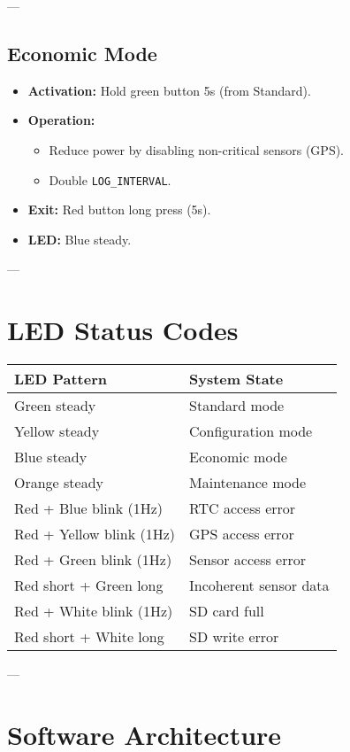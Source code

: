 \documentclass[a4paper,12pt]{article}
\begin{document}
---

\subsection{Economic Mode}
\begin{itemize}
  \item \textbf{Activation:} Hold green button 5s (from Standard).
  \item \textbf{Operation:}
  \begin{itemize}
    \item Reduce power by disabling non-critical sensors (GPS).
    \item Double \texttt{LOG\_INTERVAL}.
  \end{itemize}
  \item \textbf{Exit:} Red button long press (5s).
  \item \textbf{LED:} Blue steady.
\end{itemize}

---

\section{LED Status Codes}

\begin{longtable}{|l|l|}
\hline
\textbf{LED Pattern} & \textbf{System State} \\ \hline
Green steady & Standard mode \\ \hline
Yellow steady & Configuration mode \\ \hline
Blue steady & Economic mode \\ \hline
Orange steady & Maintenance mode \\ \hline
Red + Blue blink (1Hz) & RTC access error \\ \hline
Red + Yellow blink (1Hz) & GPS access error \\ \hline
Red + Green blink (1Hz) & Sensor access error \\ \hline
Red short + Green long & Incoherent sensor data \\ \hline
Red + White blink (1Hz) & SD card full \\ \hline
Red short + White long & SD write error \\ \hline
\end{longtable}

---

\section{Software Architecture}
\end{document}
